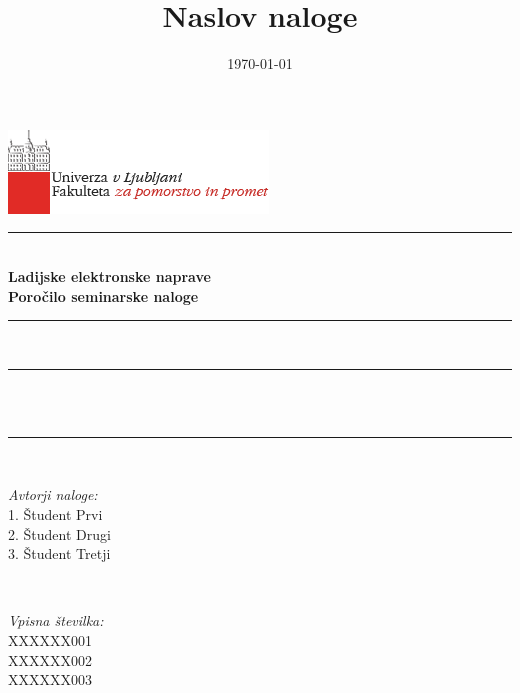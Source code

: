 \documentclass[11pt,a4]{article}
\title{Naslov naloge}
\date{\today}
\author{}
\makeatletter
\let\thetitle\@title
\let\thedate\@date
\makeatother
\begin{document}

\begin{titlepage}
	\centering
	\vspace*{-2cm}
    \includegraphics[scale = 0.75]{logo_FPP.png}\\[1.0 cm]
    
	\rule{\linewidth}{1 mm} \\[0.4 cm]
	{ \huge \bfseries Ladijske elektronske naprave} \\[0.5 cm]
	{ \Large \bfseries Poročilo seminarske naloge}
	\rule{\linewidth}{1 mm} \\[1 cm]
	
	\rule{\linewidth}{0.5 mm} \\[0.4 cm]
	{ \large \bfseries \thetitle}\\[0.0 cm]
	\rule{\linewidth}{0.5 mm} \\[2 cm]
	
	\begin{minipage}{0.4\textwidth}
		\begin{flushleft} \large
			\emph{Avtorji naloge:}\\
			1. Študent Prvi\\
			2. Študent Drugi\\
			3. Študent Tretji
			\end{flushleft}
			\end{minipage}~
			\begin{minipage}{0.4\textwidth}
			\begin{flushright} \large
			\emph{Vpisna številka:} \\
			XXXXXX001\\
			XXXXXX002\\
			XXXXXX003									%
		\end{flushright}
	\end{minipage}\\[2 cm]
	
	\vfill
	
	{\large \thedate}\\[2 cm]
 
	
	
\end{titlepage}
\end{document}
